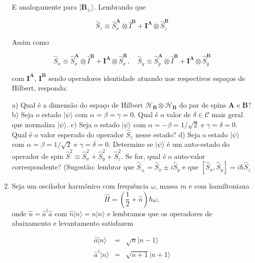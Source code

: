 \begin{enumerate}[start=1,label={\bfseries Q\arabic*.}]
E analogamente para $| \mathbf{B}_{\pm} \rangle$. Lembrando que

$$
\hat{S}_{z} \equiv \hat{S}_{x}^{\mathbf{A}} \otimes \hat{I}^{\mathbf{B}} + \mathbf{I}^{\mathbf{A}} \otimes \hat{S}_{z}^{\mathbf{B}}
$$

Assim como

$$
\hat{S}_{x} \equiv \hat{S}_{x}^{\mathbf{A}} \otimes \hat{I}^{\mathbf{B}} + \mathbf{I}^{\mathbf{A}} \otimes \hat{S}_{x}^{\mathbf{B}}, \quad
\hat{S}_{y} \equiv \hat{S}_{y}^{\mathbf{A}} \otimes \hat{I}^{\mathbf{B}} + \mathbf{I}^{\mathbf{A}} \otimes \hat{S}_{y}^{\mathbf{B}}
$$

com $\mathbf{I}^{\mathbf{A}}$, $\mathbf{I}^{\mathbf{B}}$ sendo operadores identidade atuando nos respectivos espaços de Hilbert, responda:


a) Qual é a dimensão do espaço de Hilbert $\mathbf{\mathcal{H}}_{\mathbf{B}} \otimes \mathbf{\mathcal{H}}_{\mathbf{B}}$ do par de spins $\mathbf{A}$ e $\mathbf{B}$?
b) Seja o estado $|\psi\rangle$ com $\alpha = \beta = \gamma = 0$. Qual é o valor de $\delta \in \mathcal{C}$ mais geral que normaliza $|\psi\rangle$.
c) Seja o estado $|\psi\rangle$ com $\alpha = -\beta = 1/\sqrt{2}$ e $\gamma = \delta = 0$. Qual é o valor esperado do operador $\hat{S}_{z}$ nesse estado?
d) Seja o estado $|\psi\rangle$ com $\alpha = \beta = 1/\sqrt{2}$ e $\gamma = \delta = 0$. Determine se $|\psi\rangle$ é um auto-estado do operador de spin $\hat{S}^{2} \equiv \hat{S}_{x}^{2} + \hat{S}_{y}^{2} + \hat{S}_{z}^{2}$. Se for, qual é o auto-valor correspondente? (Sugestão: lembrar que $\hat{S}_{\pm} = \hat{S}_{x} \pm i \hat{S}_{y}$ e que $\left[ \hat{S}_{x}, \hat{S}_{y} \right] = i \hbar \hat{S}_{z}$




\item Seja um oscilador harmônico com frequência $\omega$, massa $m$ e com hamiltoniana
\begin{equation}
  \hat{H} = \left(\frac{1}{2} + \hat{n} \right) \hbar \omega,
\end{equation}
onde $\hat{n} = \hat{a}^{\dagger}\hat{a}$ com $\hat{n}|n \rangle = n|n \rangle$ e lembramos que os operadores de abaixamento e levantamento satisfazem


\begin{eqnarray*}
  \hat{a} | n \rangle &=& \sqrt{n} | n - 1 \rangle \\
  \hat{a}^{\dagger} | n \rangle &=& \sqrt{n+1} | n + 1 \rangle
\end{eqnarray*}


\end{enumerate}
